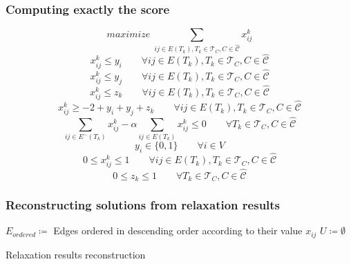 \documentclass{beamer}
\begin{document}
\begin{frame}[c]
	\frametitle{Computing exactly the score}

	\begin{equation}
		maximize\; \sum_{ij \in E(T_{k}), T_{k} \in \mathcal{T}_{C}, C \in
			\mathcal{\hat{C}} } x_{ij} ^{k}
	\end{equation}
	\begin{equation}
		x _{ij}^{k}  \leq y_i \quad\quad \forall ij \in E(T_{k}), T_{k} \in
		\mathcal{T}_{C}, C \in \mathcal{\hat{C}}
	\end{equation}
	\begin{equation}
		x _{ij} ^{k} \leq y_j \quad\quad \forall ij \in E(T_{k}), T_{k} \in
		\mathcal{T}_{C}, C \in \mathcal{\hat{C}}
	\end{equation}
	\begin{equation}
		x _{ij}^{k}  \leq z_k \quad\quad \forall ij \in E(T_k), T_k \in \mathcal{T} _{C}, C \in \hat{\mathcal{C} }
	\end{equation}
	\begin{equation}
		x _{ij} ^{k} \geq - 2 + y_i + y_j + z_k \quad\quad \forall ij \in E(T_k), T_k \in \mathcal{T} _{C}, C \in \hat{\mathcal{C} }
	\end{equation}
	\begin{equation}
		\sum^{}_{ij \in E^{-} (T_k)} x_{ij}^{k}  - \alpha \sum^{}_{ij \in E(T_k)}
		x_{ij} ^{k}  \leq 0 \quad\quad \forall T_{k} \in \mathcal{T} _{C}, C \in
		\hat{\mathcal{C}}
	\end{equation}
	\begin{equation}
		y _{i} \in  \{0, 1\} \quad\quad \forall i \in V
	\end{equation}
	\begin{equation}
		0 \leq x _{ij} ^{k}  \leq 1 \quad\quad \forall ij \in E(T_{k}), T_{k} \in
		\mathcal{T}_{C}, C \in \mathcal{\hat{C}}
	\end{equation}
	\begin{equation}
		0 \leq z _{k} \leq 1 \quad\quad \forall T_{k} \in \mathcal{T} _{C}, C \in
		\hat{\mathcal{C}}
	\end{equation}
\end{frame}

\begin{frame}[c]
	\frametitle{Reconstructing solutions from relaxation results}

	\begin{algorithm}[H]
		\SetAlgoLined
		$E_{ordered} \coloneqq$ Edges ordered in descending order according to
		their value $x_{ij} $ \;
		$U \coloneqq \emptyset$ \;
		\caption{Relaxation results reconstruction}
	\end{algorithm}

\end{frame}
\end{document}
